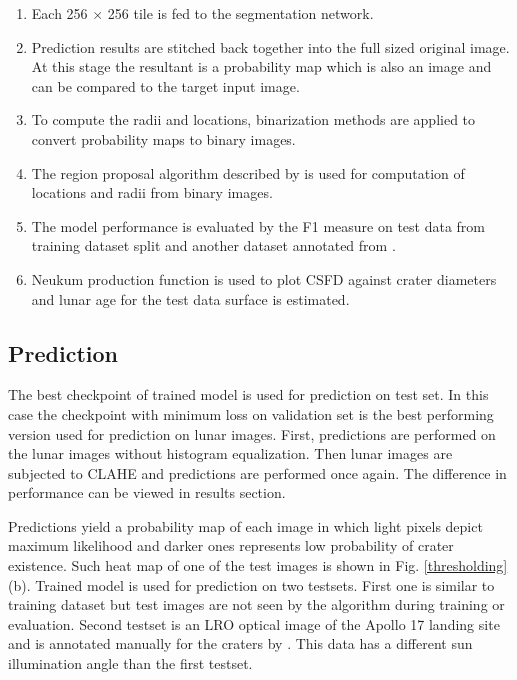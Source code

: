 \documentclass[11pt]{article}
\begin{document}
\begin{enumerate}
	\item Each 256 $\times$ 256 tile is fed to the segmentation network.
	\item Prediction results are stitched back together into the full sized original image. At this stage the resultant is a probability map which is also an image and can be compared to the target input image.
	\item To compute the radii and locations, binarization methods are applied to convert probability maps to binary images.
	\item The region proposal algorithm described by \cite{reiss1993recognizing} is used for computation of locations and radii from binary images.
	\item The model performance is evaluated by the F1 measure on test data from training dataset split and another dataset annotated from \cite{dino2020}.
	\item Neukum production function is used to plot CSFD against crater diameters and lunar age for the test data surface is estimated.
\end{enumerate}

\subsection{Prediction}
The best checkpoint of trained model is used for prediction on test set. In this case the checkpoint with minimum loss on validation set is the best performing version used for prediction on lunar images. First, predictions are performed on the lunar images without histogram equalization. Then lunar images are subjected to CLAHE and predictions are performed once again. The difference in performance can be viewed in results section.

Predictions yield a probability map of each image in which light pixels depict maximum likelihood and darker ones represents low probability of crater existence. Such heat map of one of the test images is shown in Fig. \ref{thresholding} (b). Trained model is used for prediction on two testsets. First one is similar to training dataset but test images are not seen by the algorithm during training or evaluation. Second testset is an LRO optical image of the Apollo 17 landing site and is annotated manually for the craters by \cite{dino2020}. This data has a different sun illumination angle than the first testset.
\end{document}

